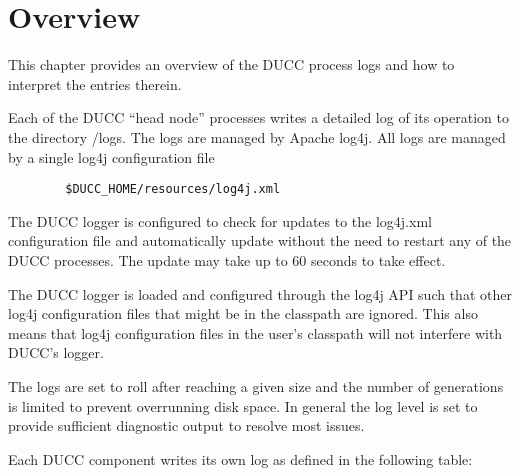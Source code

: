 % 
% 
% 
% 
 \section{Overview}

    This chapter provides an overview of the DUCC process logs and how to interpret the
    entries therein.

    Each of the DUCC ``head node'' processes writes a detailed log of its operation to
    the directory \ducchome/logs.  The logs are managed by Apache log4j.  All logs are
    managed by a single log4j configuration file
\begin{verbatim}
        $DUCC_HOME/resources/log4j.xml
\end{verbatim}

    The DUCC logger is configured to check for updates to the log4j.xml
    configuration file and automatically update without the need to restart any of
    the DUCC processes.  The update may take up to 60 seconds to take effect.

    The DUCC logger is loaded and configured through the log4j API such that other
    log4j configuration files that might be in the classpath are ignored.  This also
    means that log4j configuration files in the user's classpath will not interfere
    with DUCC's logger.

    The logs are set to roll after reaching a given size and the number of generations
    is limited to prevent overrunning disk space.  In general the log level is set to
    provide sufficient diagnostic output to resolve most issues.

    Each DUCC component writes its own log as defined in the following table:


